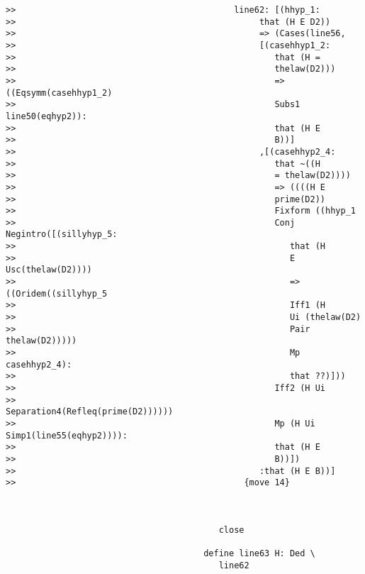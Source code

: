 \documentclass[12pt]{article}
\begin{document}
\begin{verbatim}
>>                                           line62: [(hhyp_1:
>>                                                that (H E D2))
>>                                                => (Cases(line56,
>>                                                [(casehhyp1_2:
>>                                                   that (H =
>>                                                   thelaw(D2)))
>>                                                   => ((Eqsymm(casehhyp1_2)
>>                                                   Subs1 line50(eqhyp2)):
>>                                                   that (H E
>>                                                   B))]
>>                                                ,[(casehhyp2_4:
>>                                                   that ~((H
>>                                                   = thelaw(D2))))
>>                                                   => ((((H E
>>                                                   prime(D2))
>>                                                   Fixform ((hhyp_1
>>                                                   Conj Negintro([(sillyhyp_5:
>>                                                      that (H
>>                                                      E Usc(thelaw(D2))))
>>                                                      => ((Oridem((sillyhyp_5
>>                                                      Iff1 (H
>>                                                      Ui (thelaw(D2)
>>                                                      Pair thelaw(D2)))))
>>                                                      Mp casehhyp2_4):
>>                                                      that ??)]))
>>                                                   Iff2 (H Ui
>>                                                   Separation4(Refleq(prime(D2))))))
>>                                                   Mp (H Ui Simp1(line55(eqhyp2)))):
>>                                                   that (H E
>>                                                   B))])
>>                                                :that (H E B))]
>>                                             {move 14}



                                          close

                                       define line63 H: Ded \
                                          line62


\end{verbatim}
\end{document}
